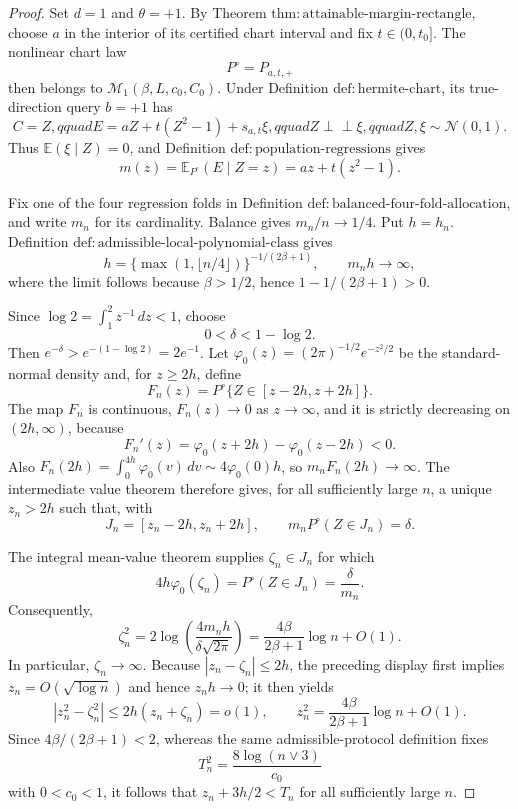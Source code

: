 \documentclass{article}
\begin{document}
\begin{proof}
Set \(d=1\) and \(\theta=+1\). By Theorem \(\mathrm{thm:attainable\text{-}margin\text{-}rectangle}\), choose \(a\) in the interior of its certified chart interval and fix \(t\in(0,t_0]\). The nonlinear chart law
\[
P^\circ=P_{a,t,+}
\]
then belongs to \(\mathcal M_1(\beta,L,c_0,C_0)\). Under Definition \(\mathrm{def:hermite\text{-}chart}\), its true-direction query \(b=+1\) has
\[
C=Z,qquad E=aZ+t(Z^2-1)+s_{a,t}\xi,qquad
Z\mathrel{\perp\!\!\!\perp}\xi,qquad Z,\xi\sim\mathcal N(0,1).
\]
Thus \(\mathbb E(\xi\mid Z)=0\), and Definition \(\mathrm{def:population\text{-}regressions}\) gives
\[
m(z)=\mathbb E_{P^\circ}(E\mid Z=z)=az+t(z^2-1).
\]

Fix one of the four regression folds in Definition \(\mathrm{def:balanced\text{-}four\text{-}fold\text{-}allocation}\), and write \(m_n\) for its cardinality. Balance gives \(m_n/n\to1/4\). Put \(h=h_n\). Definition \(\mathrm{def:admissible\text{-}local\text{-}polynomial\text{-}class}\) gives
\[
h=\{\max(1,\lfloor n/4\rfloor)\}^{-1/(2\beta+1)},
\qquad m_nh\longrightarrow\infty,
\]
where the limit follows because \(\beta>1/2\), hence \(1-1/(2\beta+1)>0\).

Since \(\log2=\int_1^2z^{-1}\,dz<1\), choose
\[
0<\delta<1-\log2.
\]
Then \(e^{-\delta}>e^{-(1-\log2)}=2e^{-1}\). Let \(\varphi_0(z)=(2\pi)^{-1/2}e^{-z^2/2}\) be the standard-normal density and, for \(z\ge2h\), define
\[
F_n(z)=P^\circ\{Z\in[z-2h,z+2h]\}.
\]
The map \(F_n\) is continuous, \(F_n(z)\to0\) as \(z\to\infty\), and it is strictly decreasing on \((2h,\infty)\), because
\[
F_n'(z)=\varphi_0(z+2h)-\varphi_0(z-2h)<0.
\]
Also \(F_n(2h)=\int_0^{4h}\varphi_0(v)\,dv\sim4\varphi_0(0)h\), so \(m_nF_n(2h)\to\infty\). The intermediate value theorem therefore gives, for all sufficiently large \(n\), a unique \(z_n>2h\) such that, with
\[
J_n=[z_n-2h,z_n+2h],
\qquad m_nP^\circ(Z\in J_n)=\delta.
\]

The integral mean-value theorem supplies \(\zeta_n\in J_n\) for which
\[
4h\varphi_0(\zeta_n)=P^\circ(Z\in J_n)=\frac{\delta}{m_n}.
\]
Consequently,
\[
\zeta_n^2
=2\log\!\left(\frac{4m_nh}{\delta\sqrt{2\pi}}\right)
=\frac{4\beta}{2\beta+1}\log n+O(1).
\]
In particular, \(\zeta_n\to\infty\). Because \(|z_n-\zeta_n|\le2h\), the preceding display first implies \(z_n=O(\sqrt{\log n})\) and hence \(z_nh\to0\); it then yields
\[
|z_n^2-\zeta_n^2|
\le2h(z_n+\zeta_n)=o(1),
\qquad
z_n^2=\frac{4\beta}{2\beta+1}\log n+O(1).
\]
Since \(4\beta/(2\beta+1)<2\), whereas the same admissible-protocol definition fixes
\[
T_n^2=\frac{8\log(n\vee3)}{c_0}
\]
with \(0<c_0<1\), it follows that \(z_n+3h/2<T_n\) for all sufficiently large \(n\).


\end{proof}
\end{document}
